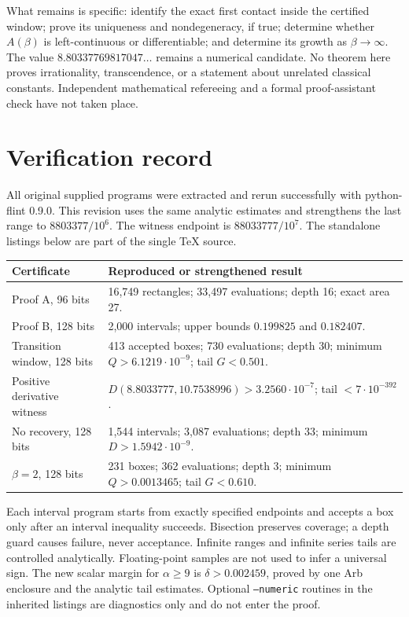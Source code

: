 \documentclass[11pt,a4paper]{article}
\theoremstyle{plain}
\theoremstyle{remark}
\begin{document}
What remains is specific: identify the exact first contact inside the certified
window; prove its uniqueness and nondegeneracy, if true; determine whether
$A(\beta)$ is left-continuous or differentiable; and determine its growth as
$\beta\to\infty$. The value $8.80337769817047\ldots$ remains a numerical candidate.
No theorem here proves irrationality, transcendence, or a statement about
unrelated classical constants. Independent mathematical refereeing and a
formal proof-assistant check have not taken place.

\section{Verification record}\label{sec:record}
All original supplied programs were extracted and rerun successfully with
python-flint 0.9.0. This revision uses the same analytic estimates and strengthens
the last range to $8803377/10^6$. The witness endpoint is $88033777/10^7$.
The standalone listings below are part of the single TeX source.
\begin{center}\small
\begin{tabular}{p{4.2cm}p{9.5cm}}\toprule
Certificate & Reproduced or strengthened result\\\midrule
Proof A, 96 bits & 16,749 rectangles; 33,497 evaluations; depth 16; exact area 27.\\
Proof B, 128 bits & 2,000 intervals; upper bounds $0.199825$ and $0.182407$.\\
Transition window, 128 bits & 413 accepted boxes; 730 evaluations; depth 30;
minimum $Q>6.1219\cdot10^{-9}$; tail $G<0.501$.\\
Positive derivative witness & $D(8.8033777,10.7538996)>3.2560\cdot10^{-7}$;
tail $<7\cdot10^{-392}$.\\
No recovery, 128 bits & 1,544 intervals; 3,087 evaluations; depth 33;
minimum $D>1.5942\cdot10^{-9}$.\\
$\beta=2$, 128 bits & 231 boxes; 362 evaluations; depth 3;
minimum $Q>0.0013465$; tail $G<0.610$.\\\bottomrule
\end{tabular}
\end{center}
Each interval program starts from exactly specified endpoints and accepts a box
only after an interval inequality succeeds. Bisection preserves coverage;
a depth guard causes failure, never acceptance. Infinite ranges and infinite
series tails are controlled analytically. Floating-point samples are not used
to infer a universal sign. The new scalar margin for $\alpha\ge9$ is
$\delta>0.002459$, proved by one Arb enclosure and the analytic tail estimates.
Optional \texttt{--numeric} routines in the inherited listings are diagnostics
only and do not enter the proof.
\end{document}
